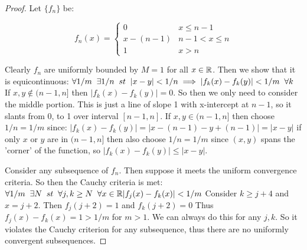 \documentclass[11pt]{article}
\begin{document}
\begin{proof}

    Let $\{f_n\}$ be:

    $$f_n(x) = \begin{cases}
        0 & x \leq n-1\\
        x - (n-1) & n-1 < x \leq n\\
        1 & x > n
    \end{cases}$$

    Clearly $f_n$ are uniformly bounded by $M = 1$ for all $x \in \reals$.
    Then we show that it is equicontinuous:
    $\forall 1/m \sp \exists 1/n \sp st \sp |x - y| < 1/n \implies |f_k(x) - f_k(y)| < 1/m \sp \forall k$
    If $x,y \notin (n-1, n]$ then $|f_k(x) - f_k(y)| = 0$.
    So then we only need to consider the middle portion. This is just
    a line of slope 1 with x-intercept at $n-1$, so it slants from 0, to 1 over interval $[n-1, n]$.
    If $x,y \in (n-1, n]$ then choose $1/n = 1/m$ since: 
    $|f_k(x) - f_k(y)| = |x - (n-1) - y + (n-1)| = |x-y|$
    if only $x$ or $y$ are in $(n-1, n]$ then also choose $1/n = 1/m$
    since $(x,y)$ spans the 'corner' of the function, so $|f_k(x) - f_k(y)| \leq |x-y|$.

    Consider any subsequence of $f_n$. Then suppose it meets the uniform convergence criteria.
    So then the Cauchy criteria is met:
    $\forall 1/m \sp \exists N \sp st \sp \forall j,k \geq N \sp \forall x \in \reals |f_j(x) - f_k(x)| < 1/m$
    Consider $k \geq j + 4$ and $x = j + 2$. Then $f_j(j + 2) = 1$
    and $f_k(j + 2) = 0$ Thus $f_j(x) - f_k(x) = 1 > 1/m$ for $m > 1$.
    We can always do this for any $j,k$. So it violates the Cauchy criterion
    for any subsequence, thus there are no uniformly convergent subsequences.

\end{proof}
\end{document}
